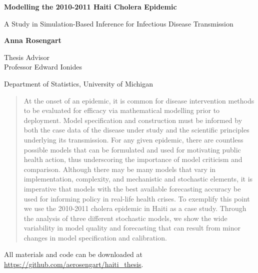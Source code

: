 \documentclass[12pt]{article}
\date{This manuscript was compiled on \today}
\begin{document}
\def\spacingset#1{\renewcommand{\baselinestretch}%
{#1}\small\normalsize} \spacingset{1}

\thispagestyle{plain}
\begin{center}
    \Large
    \textbf{Modelling the 2010-2011 Haiti Cholera Epidemic}
        
    \vspace{0.1cm}
    \large
    A Study in Simulation-Based Inference for Infectious Disease Transmission
        
    \vspace{0.4cm}
    \textbf{Anna Rosengart}
    
    \vspace{0.4cm}
    Thesis Advisor\\
    Professor Edward Ionides
    
    \vspace{0.2cm}
    Department of Statistics, University of Michigan
       
    \vspace{0.9cm}
\end{center}

\begin{abstract}
At the onset of an epidemic, it is common for disease intervention methods to be evaluated for efficacy via mathematical modelling prior to deployment. Model specification and construction must be informed by both the case data of the disease under study and the scientific principles underlying its transmission. For any given epidemic, there are countless possible models that can be formulated and used for motivating public health action, thus underscoring the importance of model criticism and comparison. Although there may be many models that vary in implementation, complexity, and mechanistic and stochastic elements, it is imperative that models with the best available forecasting accuracy be used for informing policy in real-life health crises. To exemplify this point we use the 2010-2011 cholera epidemic in Haiti as a case study. Through the analysis of three different stochastic models, we show the wide variability in model quality and forecasting that can result from minor changes in model specification and calibration. 
\end{abstract}

\vfill

\noindent All materials and code can be downloaded at \url{https://github.com/aerosengart/haiti_thesis}.

\newpage
\end{document}

